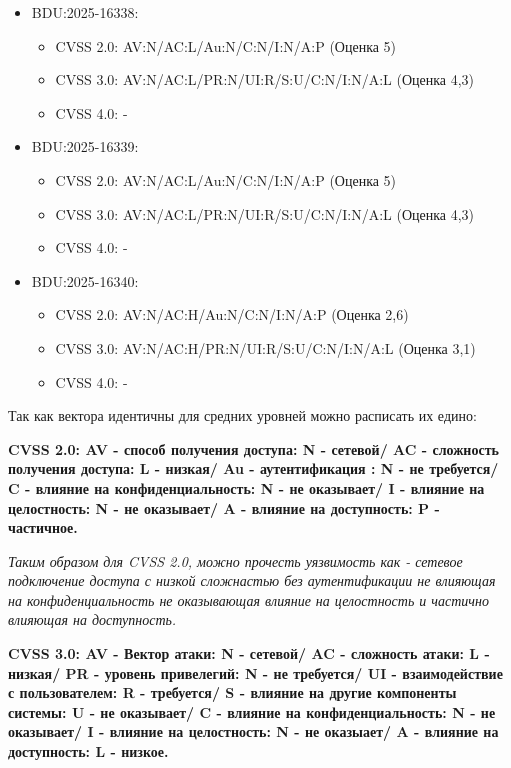 \documentclass[areasetadvanced]{scrartcl}
\begin{document}
\begin{itemize}
    \item BDU:2025-16338: \begin{itemize}
        \item CVSS 2.0: AV:N/AC:L/Au:N/C:N/I:N/A:P (Оценка 5)
        \item CVSS 3.0: AV:N/AC:L/PR:N/UI:R/S:U/C:N/I:N/A:L (Оценка 4,3)
        \item CVSS 4.0: -
    \end{itemize} 
    \item BDU:2025-16339: \begin{itemize}
        \item CVSS 2.0: AV:N/AC:L/Au:N/C:N/I:N/A:P (Оценка 5)
        \item CVSS 3.0: AV:N/AC:L/PR:N/UI:R/S:U/C:N/I:N/A:L (Оценка 4,3)
        \item CVSS 4.0: -
    \end{itemize} 
    \item BDU:2025-16340: \begin{itemize}
        \item CVSS 2.0: AV:N/AC:H/Au:N/C:N/I:N/A:P (Оценка 2,6)
        \item CVSS 3.0: AV:N/AC:H/PR:N/UI:R/S:U/C:N/I:N/A:L (Оценка 3,1)
        \item CVSS 4.0: -
    \end{itemize} 
\end{itemize}

Так как вектора идентичны для средних уровней можно расписать их едино:

\textbf{CVSS 2.0: AV - способ получения доступа: N - сетевой/ AC - сложность получения доступа: L - низкая/ Au - аутентификация : N - не требуется/
C - влияние на конфиденциальность: N - не оказывает/ I - влияние на целостность: N - не оказывает/ A - влияние на доступность: P - частичное.}

\emph{Таким образом для CVSS 2.0, можно прочесть уязвимость как - сетевое подключение доступа с низкой сложнастью без аутентификации не влияющая на конфиденциальность не оказывающая влияние на целостность и частично влияющая на доступность.}

\textbf{CVSS 3.0: AV - Вектор атаки: N - сетевой/ AC - сложность атаки: L - низкая/ PR - уровень привелегий: N - не требуется/ UI - взаимодействие с пользователем: R - требуется/ S - влияние на другие компоненты системы: U - не оказывает/ C - влияние на конфиденциальность: N - не оказывает/ I - влияние на целостность: N - не оказыает/ A - влияние на доступность: L - низкое.}
\end{document}
